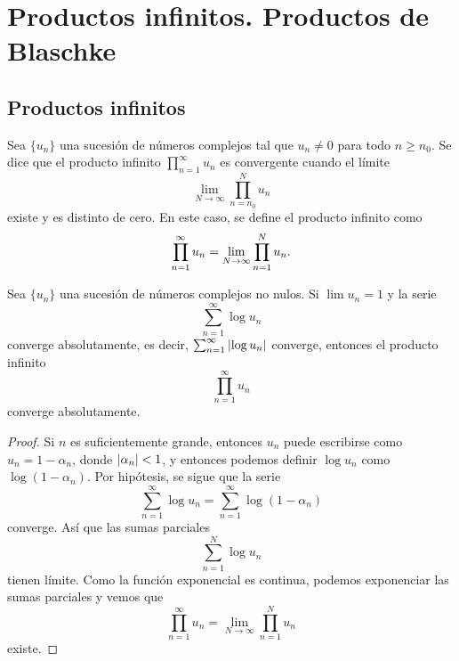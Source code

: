 \chapter{Productos infinitos. Productos de Blaschke}

\section{Productos infinitos}


\begin{definition}
    Sea $\{u_n\}$ una sucesión de números complejos tal que $u_n \neq 0$ para todo $n \geq n_0$. Se dice que el producto infinito $\prod_{n=1}^{\infty} u_n$ es convergente cuando el límite
    \begin{equation*}
        \lim_{N \to \infty} \prod_{n=n_0}^{N} u_n
    \end{equation*}
    existe y es distinto de cero. En este caso, se define el producto infinito como
    \begin{equation*}
        \prod_{n=1}^{\infty} u_n = \lim_{N \to \infty} \prod_{n=1}^{N} u_n. \\
    \end{equation*}
\end{definition}


\begin{prop}
    Sea $\{u_n\}$ una sucesión de números complejos no nulos. Si $\lim u_n =1$ y la serie
    \begin{equation*}
        \sum_{n=1}^{\infty} \log u_n
    \end{equation*}
    converge absolutamente, es decir, $ \sum_{n=1}^{\infty} \left\lvert\log u_n\right\rvert$ converge, entonces el producto infinito
    \begin{equation*}
        \prod_{n=1}^{\infty} u_n
    \end{equation*}
    converge absolutamente.
\end{prop}

\begin{proof}
    Si $n$ es suficientemente grande, entonces $u_n$ puede escribirse como $u_n = 1 - \alpha_n$, donde $\left\lvert\alpha_n\right\rvert < 1$, y entonces podemos definir $\log{u_n}$ como $\log{(1 - \alpha_n)}$. Por hipótesis, se sigue que la serie
    \begin{equation*}
        \sum_{n=1}^{\infty} \log u_n = \sum_{n=1}^{\infty} \log{(1 - \alpha_n)}
    \end{equation*}
    converge. Así que las sumas parciales
    \begin{equation*}
        \sum_{n=1}^{N} \log u_n
    \end{equation*}
    tienen límite. Como la función exponencial es continua, podemos exponenciar las sumas parciales y vemos que
    \begin{equation*}
        \prod_{n=1}^{\infty} u_n = \lim_{N \to \infty} \prod_{n=1}^{N} u_n
    \end{equation*}
    existe.
\end{proof}

